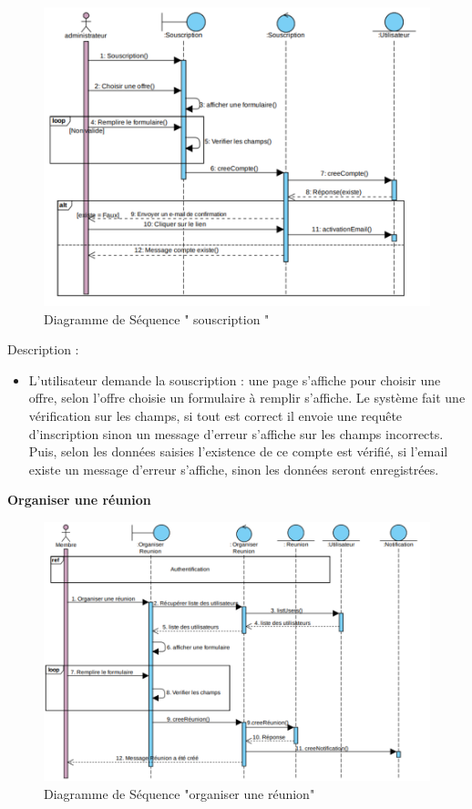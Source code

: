 \begin{figure}[h]
    \centering
    \includegraphics{figures/3anis6.png}
    \caption{Diagramme de Séquence " souscription "}
    \label{fig:Séquence_souscription}
\end{figure}
\par Description : 
\begin{itemize}
    \item L’utilisateur demande la souscription : une page s’affiche pour choisir une offre, selon l’offre choisie un formulaire à remplir s'affiche. Le système fait une vérification sur les champs, si tout est correct il envoie une requête d’inscription sinon un message d’erreur s’affiche sur les champs incorrects. Puis, selon les données saisies l'existence de ce compte est vérifié, si l’email existe un message d’erreur s’affiche, sinon les données seront enregistrées. 
\end{itemize}
\newpage\par \textbf{	Organiser une réunion   }
\begin{figure}[h]
    \centering
    \includegraphics{figures/3anis7.png}
    \caption{Diagramme de Séquence "organiser une réunion"}
    \label{fig:Séquence_organiser}
\end{figure}
